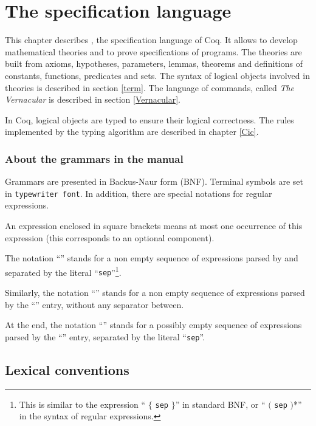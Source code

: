 \chapter{The \gallina{} specification language}
\label{Gallina}

This chapter describes \gallina, the specification language of Coq.
It allows to develop mathematical theories and to prove specifications
of programs.  The theories are built from axioms, hypotheses,
parameters, lemmas, theorems and definitions of constants, functions,
predicates and sets. The syntax of logical objects involved in
theories is described in section \ref{term}. The language of
commands, called {\em The Vernacular} is described in section
\ref{Vernacular}.

In Coq, logical objects are typed to ensure their logical
correctness. The rules implemented by the typing algorithm are described in
chapter \ref{Cic}.

\subsection*{About the grammars in the manual}

Grammars are presented in Backus-Naur form (BNF). Terminal symbols are
set in {\tt typewriter font}.  In addition, there are special
notations for regular expressions.

An expression enclosed in square brackets \zeroone{\ldots} means at
most one occurrence of this expression (this corresponds to an
optional component).

The notation ``'' stands for a non empty
sequence of expressions parsed by {\entry} and
separated by the literal ``{\tt sep}''\footnote{This is similar to the
expression ``{\entry} $\{$ {\tt sep} {\entry} $\}$'' in
standard BNF, or ``{\entry} $($ {\tt sep} {\entry} $)$*'' in
the syntax of regular expressions.}.

Similarly, the notation ``\nelist{\entry}{}'' stands for a non
empty sequence of expressions parsed by the ``{\entry}'' entry,
without any separator between.

At the end, the notation ``'' stands for a
possibly empty sequence of expressions parsed by the ``{\entry}'' entry,
separated by the literal ``{\tt sep}''.

\section{Lexical conventions}
\label{lexical}

